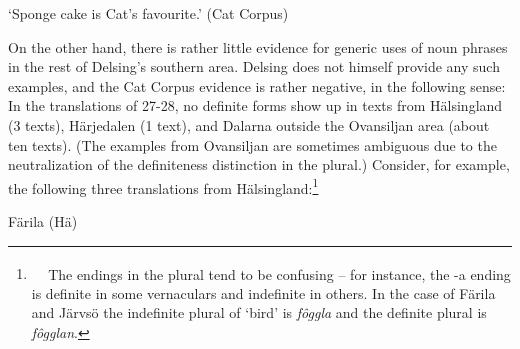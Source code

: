 \begin{styleTranslation}
‘Sponge cake is Cat’s favourite.’ (Cat Corpus)

\end{styleTranslation}

\begin{styleBodyTextFirst}
On the other hand, there is rather little evidence for generic uses of noun phrases in the rest of Delsing’s southern area. Delsing does not himself provide any such examples, and the Cat Corpus evidence is rather negative, in the following sense: In the translations of 27{}-28, no definite forms show up in texts from Hälsingland (3 texts), Härjedalen (1 text), and Dalarna outside the Ovansiljan area (about ten texts). (The examples from Ovansiljan are sometimes ambiguous due to the neutralization of the definiteness distinction in the plural.) Consider, for example, the following three translations from Hälsingland:\footnote{\textsuperscript{\ \ } The endings in the plural tend to be confusing – for instance, the -a ending is definite in some vernaculars and indefinite in others. In the case of Färila and Järvsö the indefinite plural of ‘bird’ is \textit{fôggla} and the definite plural is \textit{fôgglan}. }

\end{styleBodyTextFirst}


\begin{listWWNumileveli}
\item {}

\end{listWWNumileveli}

\begin{listWWNumxxleveli}
\item {}

\begin{styleExLtrTbl}
Färila (Hä)

\end{styleExLtrTbl}

\end{listWWNumxxleveli}


